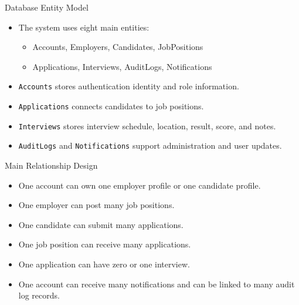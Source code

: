 \documentclass[aspectratio=169]{beamer}
\begin{document}
\begin{frame}{Database Entity Model}
  \begin{itemize}
    \item The system uses eight main entities:
      \begin{itemize}
        \item Accounts, Employers, Candidates, JobPositions
        \item Applications, Interviews, AuditLogs, Notifications
      \end{itemize}
    \item \texttt{Accounts} stores authentication identity and role information.
    \item \texttt{Applications} connects candidates to job positions.
    \item \texttt{Interviews} stores interview schedule, location, result, score, and notes.
    \item \texttt{AuditLogs} and \texttt{Notifications} support administration and user updates.
  \end{itemize}
\end{frame}

\begin{frame}{Main Relationship Design}
  \begin{itemize}
    \item One account can own one employer profile or one candidate profile.
    \item One employer can post many job positions.
    \item One candidate can submit many applications.
    \item One job position can receive many applications.
    \item One application can have zero or one interview.
    \item One account can receive many notifications and can be linked to many audit log records.
  \end{itemize}
\end{frame}
\end{document}
